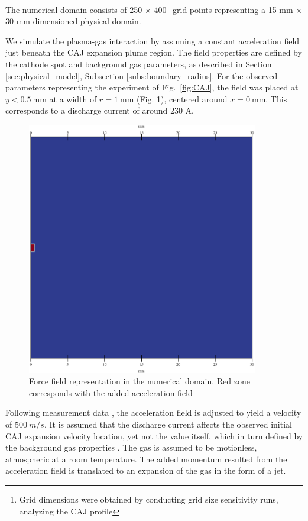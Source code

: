 \documentclass[a4paper]{iacas}%
\begin{document}
The numerical domain consists of 250 $\times$ 400\footnote{Grid dimensions were obtained by conducting grid size sensitivity runs, analyzing the CAJ profile} grid points representing a 15 mm $\times$ 30 mm dimensioned physical domain. 

We simulate the plasma-gas interaction by assuming a constant acceleration field just beneath the CAJ expansion plume region. The field properties are defined by the cathode spot and background gas parameters, as described in Section \ref{sec:physical_model}, Subsection \ref{subs:boundary_radius}. For the observed parameters representing the experiment \cite{KR} of Fig.~\ref{fig:CAJ}, the field was placed at $ y < 0.5~ \mathrm{mm} $ at a width of $r = 1~\mathrm{mm}$ (Fig. \ref{fig:force_field}), centered around $x=0~\mathrm{mm}$. This corresponds to a discharge current of around 230 A.

\begin{figure}[htbp]
	\centering
	\includegraphics[width=0.9\textwidth]{forceField}
	\caption{Force field representation in the numerical domain. Red zone corresponds with the added acceleration field}\label{fig:force_field}
\end{figure}

Following measurement data \cite{KRClose}, the acceleration field is adjusted to yield a velocity of $500~ m/s$. It is assumed that the discharge current affects the observed initial CAJ expansion velocity location, yet not the value itself, which in turn defined by the background gas properties \cite{KR,KRClose,KRFar}. The gas is assumed to be motionless, atmospheric at a room temperature. The added momentum resulted from the acceleration field is translated to an expansion of the gas in the form of a jet.
\end{document}
